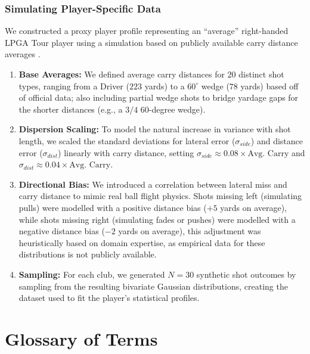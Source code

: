 \documentclass[11pt, letterpaper]{article}
\begin{document}
\subsubsection{Simulating Player-Specific Data}
\label{app: player-data}
We constructed a proxy player profile representing an ``average'' right-handed LPGA Tour player using a simulation based on publicly available carry distance averages \parencite{trackman2024averages}.
\begin{enumerate}\item 
\textbf{Base Averages:} We defined average carry distances for 20 distinct shot types, ranging from a Driver ($223$ yards) to a $60^{\circ}$ wedge ($78$ yards) based off of official data; also including partial wedge shots to bridge yardage gaps for the shorter distances (e.g., a $3/4$ 60-degree wedge). 
\item \textbf{Dispersion Scaling:} To model the natural increase in variance with shot length, we scaled the standard deviations for lateral error ($\sigma_{side}$) and distance error ($\sigma_{dist}$) linearly with carry distance, setting $\sigma_{side} \approx 0.08 \times \text{Avg. Carry}$ and $\sigma_{dist} \approx 0.04 \times \text{Avg. Carry}$. 
\item \textbf{Directional Bias:} We introduced a correlation between lateral miss and carry distance to mimic real ball flight physics. Shots missing left (simulating pulls) were modelled with a positive distance bias ($+5$ yards on average), while shots missing right (simulating fades or pushes) were modelled with a negative distance bias ($-2$ yards on average), this adjustment was heuristically based on domain expertise, as empirical data for these distributions is not publicly available.

\item \textbf{Sampling:} For each club, we generated $N=30$ synthetic shot outcomes by sampling from the resulting bivariate Gaussian distributions, creating the dataset used to fit the player's statistical profiles.
\end{enumerate}


\section{Glossary of Terms}
\label{sec:Appendix2}
\end{document}
